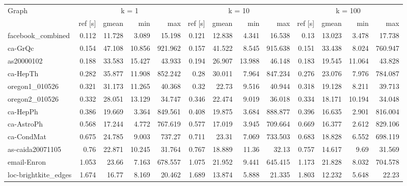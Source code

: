 \begin{landscape}
\begin{table}[h!]
\centering
\begin{tabular}{l|rrrr|rrrr|rrrr}
\toprule
Graph & \multicolumn{4}{c|}{k = 1} & \multicolumn{4}{c|}{k = 10} & \multicolumn{4}{c}{k = 100}\\
                &     ref [s] &   gmean &   min &     max &     ref [s] &   gmean &   min &     max &     ref [s] &   gmean &   min &     max \\
\midrule \midrule
 facebook\_combined    &   0.112 &  11.728 &  3.089 &  15.198 &   0.121 &  12.838 &  4.341 &  16.538 &   0.13  &  13.023 &  3.478 &  17.738 \\
 ca-GrQc              &   0.154 &  47.108 & 10.856 & 921.962 &   0.157 &  41.522 &  8.545 & 915.638 &   0.151 &  33.438 &  8.024 & 760.947 \\
 as20000102           &   0.188 &  33.583 & 15.427 &  43.933 &   0.194 &  26.907 & 13.988 &  46.148 &   0.183 &  19.545 & 11.064 &  43.828 \\
 ca-HepTh             &   0.282 &  35.877 & 11.908 & 852.242 &   0.28  &  30.011 &  7.964 & 847.234 &   0.276 &  23.076 &  7.976 & 784.087 \\
 oregon1\_010526       &   0.321 &  31.173 & 11.265 &  40.368 &   0.32  &  22.73  &  9.516 &  40.944 &   0.318 &  19.128 &  8.211 &  39.713 \\
 oregon2\_010526       &   0.332 &  28.051 & 13.129 &  34.747 &   0.346 &  22.474 &  9.019 &  36.018 &   0.334 &  18.171 & 10.194 &  34.048 \\
 ca-HepPh             &   0.386 &  19.669 &  3.364 & 849.561 &   0.408 &  19.875 &  3.684 & 888.877 &   0.396 &  16.635 &  2.901 & 816.004 \\
 ca-AstroPh           &   0.568 &  17.244 &  4.772 & 767.619 &   0.577 &  17.019 &  3.945 & 709.664 &   0.669 &  16.377 &  2.612 & 829.106 \\
 ca-CondMat           &   0.675 &  24.785 &  9.003 & 737.27  &   0.711 &  23.31  &  7.069 & 733.503 &   0.683 &  18.828 &  6.552 & 698.119 \\
 as-caida20071105     &   0.76  &  22.871 & 10.245 &  31.764 &   0.767 &  18.889 & 11.36  &  32.13  &   0.757 &  14.617 &  9.69  &  31.569 \\
 email-Enron          &   1.053 &  23.66  &  7.163 & 678.557 &   1.075 &  21.952 &  9.441 & 645.415 &   1.173 &  21.828 &  8.032 & 704.578 \\
 loc-brightkite\_edges &   1.674 &  16.77  &  8.169 &  20.462 &   1.689 &  13.874 &  5.888 &  21.335 &   1.803 &  12.232 &  5.648 &  22.23  \\

\end{tabular}
\end{table}
\end{landscape}
